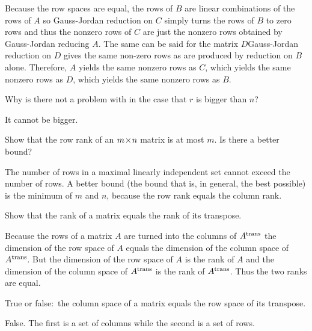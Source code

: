 \begin{exercises}
\begin{answer}
\begin{exparts}
          Because the row spaces are equal, the rows of \( B \)
          are linear combinations of the rows of \( A \) so Gauss-Jordan
          reduction on \( C \) simply turns the rows of \( B \) to zero rows
          and thus the nonzero rows of $C$ are just the nonzero rows obtained
          by Gauss-Jordan reducing \( A \).
          The same can be said for the matrix \( D \)\Dash Gauss-Jordan
          reduction on \( D \) gives the same non-zero rows as are produced
          by reduction on \( B \) alone.
          Therefore, 
          \( A \) yields the same nonzero rows as \( C  \), which yields
          the same nonzero rows as \( D \), which yields the same nonzero
          rows as \( B \).
      \end{exparts}  
    \end{answer}
  \item 
    Why is there not a problem with  
    in the case that \( r \) is bigger than \( n \)?
    \begin{answer}
      It cannot be bigger.  
    \end{answer}
  \item  
    Show that the row rank of an \( m \! \times \! n \) matrix is at most
    \( m \).
    Is there a better bound?
    \begin{answer}
      The number of rows in a maximal linearly independent set cannot
      exceed the number of rows.
      A better bound (the bound that is, in general, the best possible) is
      the minimum of \( m \) and \( n \), because the row rank equals the
      column rank.
     \end{answer}
  \recommended \item
    Show that the rank of a matrix equals the rank of its transpose.
    \begin{answer}
      Because the rows of a matrix \( A \) are turned into the columns
      of \( {{A}^{\rm trans}} \) the dimension of the row space of \( A \) equals
      the dimension of the column space of \( {{A}^{\rm trans}} \).
      But the dimension of the row space of \( A \) is the rank of \( A \) and
      the dimension of the column space of \( {{A}^{\rm trans}} \) is the rank of
      \( {{A}^{\rm trans}} \).
      Thus the two ranks are equal.
    \end{answer}
  \item 
    True or false:~the column space of a matrix equals the row space of its
    transpose.
    \begin{answer}
      False.
      The first is a set of columns while the second is a set of rows.


\end{answer}
\end{exercises}
